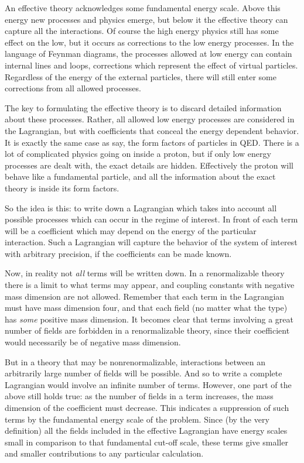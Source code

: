 An effective theory acknowledges some fundamental energy scale.  Above this energy new processes and physics emerge, but below it the effective theory can capture all the interactions.  Of course the high energy physics still has some effect on the low, but it occurs as corrections to the low energy processes.  In the language of Feynman diagrams, the processes allowed at low energy can contain internal lines and loops, corrections which represent the effect of virtual particles.  Regardless of the energy of the external particles, there will still enter some corrections from all allowed processes.

The key to formulating the effective theory is to discard detailed information about these processes.  Rather, all allowed low energy processes are considered in the Lagrangian, but with coefficients that conceal the energy dependent behavior.  It is exactly the same case as say, the form factors of particles in QED.  There is a lot of complicated physics going on inside a proton, but if only low energy processes are dealt with, the exact details are hidden.  Effectively the proton will behave like a fundamental particle, and all the information about the exact theory is inside its form factors.

So the idea is this: to write down a Lagrangian which takes into account all possible processes which can occur in the regime of interest.  In front of each term will be a coefficient which may depend on the energy of the particular interaction.  Such a Lagrangian will capture the behavior of the system of interest with arbitrary precision, if the coefficients can be made known.

Now, in reality not {\it all} terms will be written down.  In a renormalizable theory there is a limit to what terms may appear, and coupling constants with negative mass dimension are not allowed.  Remember that each term in the Lagrangian must have mass dimension four, and that each field (no matter what the type) has {\it some} positive mass dimension. It becomes clear that terms involving a great number of fields are forbidden in a renormalizable theory, since their coefficient would necessarily be of negative mass dimension.

But in a theory that may be nonrenormalizable, interactions between an arbitrarily large number of fields will be possible.   And so to write a complete Lagrangian would involve an infinite number of terms.  However, one part of the above still holds true: as the number of fields in a term increases, the mass dimension of the coefficient must decrease.  This indicates a suppression of such terms by the fundamental energy scale of the problem.  Since (by the very definition) all the fields included in the effective Lagrangian have energy scales small in comparison to that fundamental cut-off scale, these terms give smaller and smaller contributions to any particular calculation.

